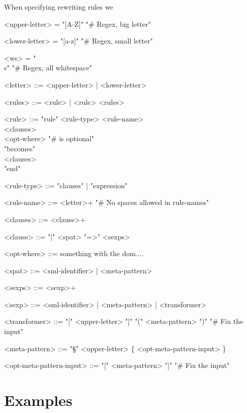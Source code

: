 \documentclass[oneside]{memoir}
\theoremstyle{definition}
\begin{document}
When specifying rewriting rules we 


\setlength{\grammarindent}{7.3em}
\begin{grammar} 
 
  <upper-letter> = "[A-Z]" \hfill "# Regex, big letter"

  <lower-letter> = "[a-z]" \hfill "# Regex, small letter"

  <ws> = "\\s" \hfill "\# Regex, all whitespace"

  <letter> ::= <upper-letter> | <lower-letter>

  <rules> ::= <rule> | <rule> <rules>

  <rule> ::= "rule" <rule-type> <rule-name> \\
             \hspace*{1em} <clauses> \\
             <opt-where> \hfill "\# is optional" \\
             "becomes" \\
             \hspace*{1em} <clauses> \\
             "end"

  <rule-type> ::= "clauses" | "expression" 

  <rule-name> ::= <letter>+ \hfill "\# No spaces allowed in rule-names"

  <clauses> ::= <clause>+

  <clause> ::= "|" <spat> "=>" <sexps>

  <opt-where> ::= something with the dom....

  <spat> ::= <sml-identifier> | <meta-pattern>

  <sexps>  ::= <sexp>+
  
  <sexp>   ::= <sml-identifier> | <meta-pattern> | <transformer>

  <transformer> ::= "[" <upper-letter> "]" "(" <meta-pattern> ")" \hfill "\# Fix the input"

  <meta-pattern> ::= "§" <upper-letter> \{ <opt-meta-pattern-input> \}

  <opt-meta-pattern-input> ::= "[" <meta-pattern> "]" \hfill "\# Fix the input"

\end{grammar}

\chapter{Examples}
\end{document}
